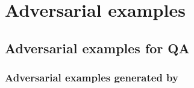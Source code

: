 

\onecolumn
\newpage
\section{Adversarial examples}
\label{appendix:examples}
\subsection{Adversarial examples for QA}
\subsubsection{Adversarial examples generated by \advcodecsent}

